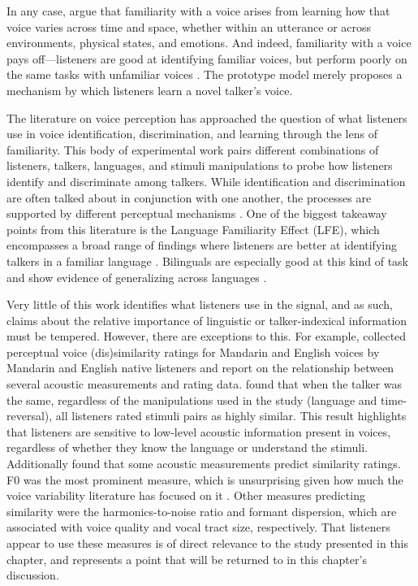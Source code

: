 In any case, \citet{lee_2019_acoustic} argue that familiarity with a voice arises from learning how that voice varies across time and space, whether within an utterance or across environments, physical states, and emotions. And indeed, familiarity with a voice pays off---listeners are good at identifying familiar voices, but perform poorly on the same tasks with unfamiliar voices \citep{nygaard_1998_talker}. The prototype model merely proposes a mechanism by which listeners learn a novel talker's voice. 

The literature on voice perception has approached the question of what listeners use in voice identification, discrimination, and learning through the lens of familiarity. This body of experimental work pairs different combinations of listeners, talkers, languages, and stimuli manipulations to probe how listeners identify and discriminate among talkers. While identification and discrimination are often talked about in conjunction with one another, the processes are supported by different perceptual mechanisms \citep{perrachione_2019_judgments}. One of the biggest takeaway points from this literature is the Language Familiarity Effect (LFE), which encompasses a broad range of findings where listeners are better at identifying talkers in a familiar language \citep[for a recent review, see][]{perrachione_2018_recognizing}. Bilinguals are especially good at this kind of task and show evidence of generalizing across languages \citep{orena_2019_identifying}. 

Very little of this work identifies what listeners use in the signal, and as such, claims about the relative importance of linguistic or talker-indexical information must be tempered. However, there are exceptions to this. For example, \citet{perrachione_2019_judgments} collected perceptual voice (dis)similarity ratings for Mandarin and English voices by Mandarin and English native listeners and report on the relationship between several acoustic measurements and rating data. \citet{perrachione_2019_judgments} found that when the talker was the same, regardless of the manipulations used in the study (language and time-reversal), all listeners rated stimuli pairs as highly similar. This result highlights that listeners are sensitive to low-level acoustic information present in voices, regardless of whether they know the language or understand the stimuli. Additionally \citet{perrachione_2019_judgments} found that some acoustic measurements predict similarity ratings. F0 was the most prominent measure, which is unsurprising given how much the voice variability literature has focused on it \cite[e.g.,][]{keating_2012_f0}. Other measures predicting similarity were the harmonics-to-noise ratio and formant dispersion, which are associated with voice quality and vocal tract size, respectively. That listeners appear to use these measures is of direct relevance to the study presented in this chapter, and represents a point that will be returned to in this chapter's discussion.

